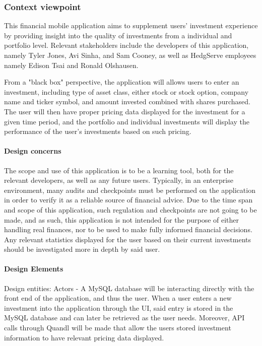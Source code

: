 \documentclass[onecolumn, draftclsnofoot,10pt, compsoc]{IEEEtran}
\begin{document}
\subsubsection{Context viewpoint}
        This financial mobile application aims to supplement users' investment experience by providing insight into the quality of investments from a individual and portfolio level.
        Relevant stakeholders include the developers of this application, namely Tyler Jones, Avi Sinha, and Sam Cooney, as well as HedgServe employees namely Edison Tsai and Ronald Olshausen.

        From a "black box" perspective, the application will allows users to enter an investment, including type of asset class, either stock or stock option, company name and ticker symbol,
        and amount invested combined with shares purchased. The user will then have proper pricing data displayed for the investment for a given time period, and the portfolio and individual
        investments will display the performance of the user's investments based on such pricing.

\paragraph{Design concerns}
        The scope and use of this application is to be a learning tool, both for the relevant developers, as well as any future users. Typically, in an enterprise environment, many audits and
        checkpoints must be performed on the application in order to verify it as a reliable source of financial advice. Due to the time span and scope of this application, such regulation and
        checkpoints are not going to be made, and as such, this application is not intended for the purpose of either handling real finances, nor to be used to make fully informed financial decisions.
        Any relevant statistics displayed for the user based on their current investments should be investigated more in depth by said user.

\paragraph{Design Elements}
        Design entities: Actors - A MySQL database will be interacting directly with the front end of the application, and thus the user. When a user enters a new investment into the application
        through the UI, said entry is stored in the MySQL database and can later be retrieved as the user needs. Moreover, API calls through Quandl will be made that allow the users stored investment
        information to have relevant pricing data displayed.
\end{document}
